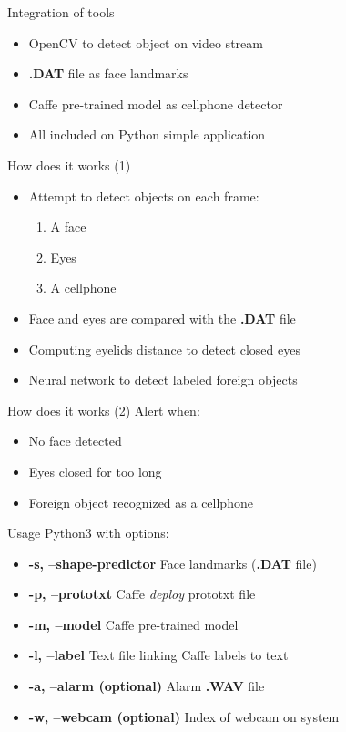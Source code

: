 \documentclass{beamer}
\begin{document}
\begin{frame}{Integration of tools}
    \begin{itemize}
        \item OpenCV to detect object on video stream
        \item \textbf{.DAT} file as face landmarks
        \item Caffe pre-trained model as cellphone detector
        \item All included on Python simple application
    \end{itemize}
\end{frame}

\begin{frame}{How does it works (1)}
    \begin{itemize}
        \item Attempt to detect objects on each frame:
            \begin{enumerate}
                \item A face
                \item Eyes
                \item A cellphone
            \end{enumerate}
        \item Face and eyes are compared with the \textbf{.DAT} file
        \item Computing eyelids distance to detect closed eyes
        \item Neural network to detect labeled foreign objects
    \end{itemize}
\end{frame}

\begin{frame}{How does it works (2)}
         Alert when:
            \begin{itemize}
                \item No face detected
                \item Eyes closed for too long
                \item Foreign object recognized as a cellphone
            \end{itemize}
\end{frame}

\begin{frame}{Usage}
    Python3 with options:
    \begin{itemize}
        \item \textbf{-s, --shape-predictor} Face landmarks (\textbf{.DAT} file)
        \item \textbf{-p, --prototxt} Caffe \textit{deploy} prototxt file
        \item \textbf{-m, --model} Caffe pre-trained model
        \item \textbf{-l, --label} Text file linking Caffe labels to text
        \item \textbf{-a, --alarm (optional)} Alarm \textbf{.WAV} file
        \item \textbf{-w, --webcam (optional)} Index of webcam on system
    \end{itemize}
\end{frame}
\end{document}
